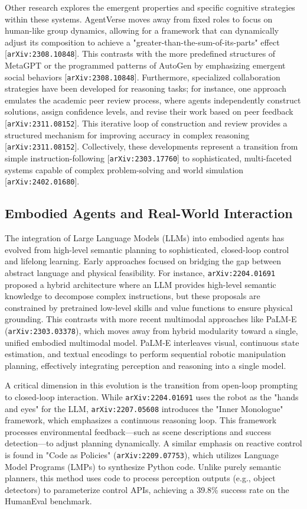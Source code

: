 \documentclass[11pt]{article}
\begin{document}
Other research explores the emergent properties and specific cognitive strategies within these systems. AgentVerse moves away from fixed roles to focus on human-like group dynamics, allowing for a framework that can dynamically adjust its composition to achieve a "greater-than-the-sum-of-its-parts" effect [\texttt{arXiv:2308.10848}]. This contrasts with the more predefined structures of MetaGPT or the programmed patterns of AutoGen by emphasizing emergent social behaviors [\texttt{arXiv:2308.10848}]. Furthermore, specialized collaboration strategies have been developed for reasoning tasks; for instance, one approach emulates the academic peer review process, where agents independently construct solutions, assign confidence levels, and revise their work based on peer feedback [\texttt{arXiv:2311.08152}]. This iterative loop of construction and review provides a structured mechanism for improving accuracy in complex reasoning [\texttt{arXiv:2311.08152}]. Collectively, these developments represent a transition from simple instruction-following [\texttt{arXiv:2303.17760}] to sophisticated, multi-faceted systems capable of complex problem-solving and world simulation [\texttt{arXiv:2402.01680}].

\subsection{Embodied Agents and Real-World Interaction}

The integration of Large Language Models (LLMs) into embodied agents has evolved from high-level semantic planning to sophisticated, closed-loop control and lifelong learning. Early approaches focused on bridging the gap between abstract language and physical feasibility. For instance, \texttt{arXiv:2204.01691} proposed a hybrid architecture where an LLM provides high-level semantic knowledge to decompose complex instructions, but these proposals are constrained by pretrained low-level skills and value functions to ensure physical grounding. This contrasts with more recent multimodal approaches like PaLM-E (\texttt{arXiv:2303.03378}), which moves away from hybrid modularity toward a single, unified embodied multimodal model. PaLM-E interleaves visual, continuous state estimation, and textual encodings to perform sequential robotic manipulation planning, effectively integrating perception and reasoning into a single model.

A critical dimension in this evolution is the transition from open-loop prompting to closed-loop interaction. While \texttt{arXiv:2204.01691} uses the robot as the "hands and eyes" for the LLM, \texttt{arXiv:2207.05608} introduces the "Inner Monologue" framework, which emphasizes a continuous reasoning loop. This framework processes environmental feedback—such as scene descriptions and success detection—to adjust planning dynamically. A similar emphasis on reactive control is found in "Code as Policies" (\texttt{arXiv:2209.07753}), which utilizes Language Model Programs (LMPs) to synthesize Python code. Unlike purely semantic planners, this method uses code to process perception outputs (e.g., object detectors) to parameterize control APIs, achieving a 39.8\% success rate on the HumanEval benchmark.
\end{document}
